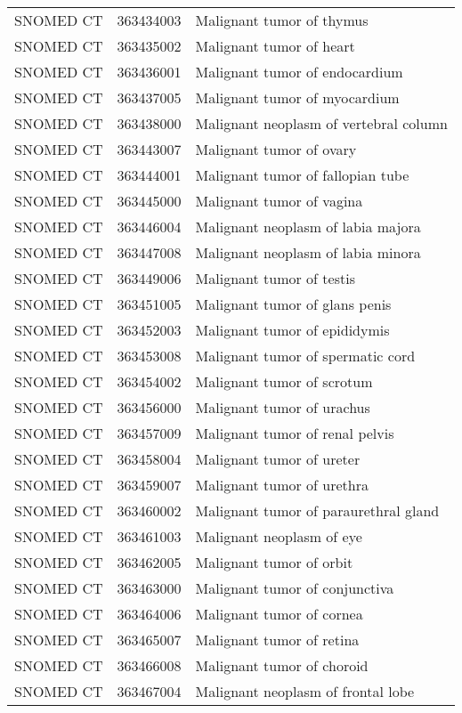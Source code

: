 \begin{longtable}{p{}p{}p{}}
  SNOMED CT & 363434003 & Malignant tumor of thymus \\ 
  SNOMED CT & 363435002 & Malignant tumor of heart \\ 
  SNOMED CT & 363436001 & Malignant tumor of endocardium \\ 
  SNOMED CT & 363437005 & Malignant tumor of myocardium \\ 
  SNOMED CT & 363438000 & Malignant neoplasm of vertebral column \\ 
  SNOMED CT & 363443007 & Malignant tumor of ovary \\ 
  SNOMED CT & 363444001 & Malignant tumor of fallopian tube \\ 
  SNOMED CT & 363445000 & Malignant tumor of vagina \\ 
  SNOMED CT & 363446004 & Malignant neoplasm of labia majora \\ 
  SNOMED CT & 363447008 & Malignant neoplasm of labia minora \\ 
  SNOMED CT & 363449006 & Malignant tumor of testis \\ 
  SNOMED CT & 363451005 & Malignant tumor of glans penis \\ 
  SNOMED CT & 363452003 & Malignant tumor of epididymis \\ 
  SNOMED CT & 363453008 & Malignant tumor of spermatic cord \\ 
  SNOMED CT & 363454002 & Malignant tumor of scrotum \\ 
  SNOMED CT & 363456000 & Malignant tumor of urachus \\ 
  SNOMED CT & 363457009 & Malignant tumor of renal pelvis \\ 
  SNOMED CT & 363458004 & Malignant tumor of ureter \\ 
  SNOMED CT & 363459007 & Malignant tumor of urethra \\ 
  SNOMED CT & 363460002 & Malignant tumor of paraurethral gland \\ 
  SNOMED CT & 363461003 & Malignant neoplasm of eye \\ 
  SNOMED CT & 363462005 & Malignant tumor of orbit \\ 
  SNOMED CT & 363463000 & Malignant tumor of conjunctiva \\ 
  SNOMED CT & 363464006 & Malignant tumor of cornea \\ 
  SNOMED CT & 363465007 & Malignant tumor of retina \\ 
  SNOMED CT & 363466008 & Malignant tumor of choroid \\ 
  SNOMED CT & 363467004 & Malignant neoplasm of frontal lobe \\ 

\end{longtable}
